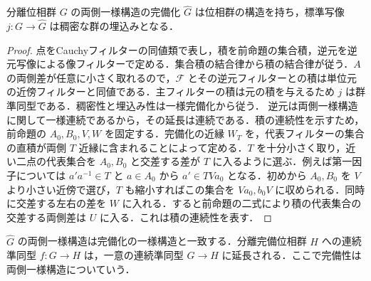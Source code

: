 \begin{prop}[完備化の群構造]
分離位相群 $G$ の両側一様構造の完備化 $\widehat G$ は位相群の構造を持ち，標準写像 $j:G\to\widehat G$ は稠密な群の埋込みとなる．
\end{prop}
\begin{proof}
点をCauchyフィルターの同値類で表し，積を前命題の集合積，逆元を逆元写像による像フィルターで定める．集合積の結合律から積の結合律が従う．$A$ の両側差が任意に小さく取れるので，$\mathcal F$ とその逆元フィルターとの積は単位元の近傍フィルターと同値である．主フィルターの積は元の積を与えるため $j$ は群準同型である．稠密性と埋込み性は一様完備化から従う．
逆元は両側一様構造に関して一様連続であるから，その延長は連続である．積の連続性を示すため，前命題の $A_0,B_0,V,W$ を固定する．完備化の近縁 $W_T$ を，代表フィルターの集合の直積が両側 $T$ 近縁に含まれることによって定める．$T$ を十分小さく取り，近い二点の代表集合を $A_0,B_0$ と交差する差が $T$ に入るように選ぶ．例えば第一因子については $a'a^{-1}\in T$ と $a\in A_0$ から $a'\in TVa_0$ となる．初めから $A_0,B_0$ を $V$ より小さい近傍で選び，$T$ も縮小すればこの集合を $Va_0,b_0V$ に収められる．同時に交差する左右の差を $W$ に入れる．すると前命題の二式により積の代表集合の交差する両側差は $U$ に入る．これは積の連続性を表す．
\end{proof}
\begin{prop}[完備群としての普遍性]
$\widehat G$ の両側一様構造は完備化の一様構造と一致する．分離完備位相群 $H$ への連続準同型 $f:G\to H$ は，一意の連続準同型 $\widehat G\to H$ に延長される．ここで完備性は両側一様構造についていう．
\end{prop}

